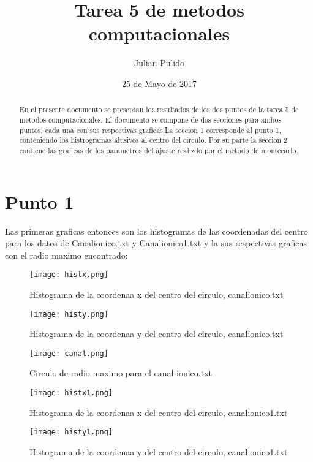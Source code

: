 \documentclass[12pt]{article}
\author{Julian Pulido}
\date{25 de Mayo de 2017}
\title{Tarea 5 de metodos computacionales}
\begin{document}
\maketitle
\begin{abstract}
En el presente documento se presentan los resultados de los dos puntos de la tarea 5 de metodos computacionales. El documento se compone de dos secciones para ambos puntos, cada una con sus respectivas graficas.La seccion 1 corresponde al punto 1, conteniendo los histrogramas alusivos al centro del circulo. Por su parte la seccion 2 contiene las graficas de los parametros del ajuste realizdo por el metodo de montecarlo.

\end{abstract} 

\section{Punto 1}
Las primeras graficas entonces son los histogramas de las coordenadas del centro para los datos de Canalionico.txt y Canalionico1.txt y la sus respectivas graficas con el radio maximo encontrado:

\begin{figure}[!h]
\centering
\texttt{[image: histx.png]}
\caption{Histograma de la coordenaa x del centro del circulo, canalionico.txt}
\end{figure}

\begin{figure}[!h]
\centering
\texttt{[image: histy.png]}
\caption{Histograma de la coordenaa y del centro del circulo, canalionico.txt}
\end{figure}

\begin{figure}[!h]
\centering
\texttt{[image: canal.png]}
\caption{Circulo de radio maximo para el canal ionico.txt}
\end{figure}


\begin{figure}[!h]
\centering
\texttt{[image: histx1.png]}
\caption{Histograma de la coordenaa x del centro del circulo, canalionico1.txt}
\end{figure}

\begin{figure}[!h]
\centering
\texttt{[image: histy1.png]}
\caption{Histograma de la coordenaa y del centro del circulo, canalionico1.txt}
\end{figure}
\end{document}

